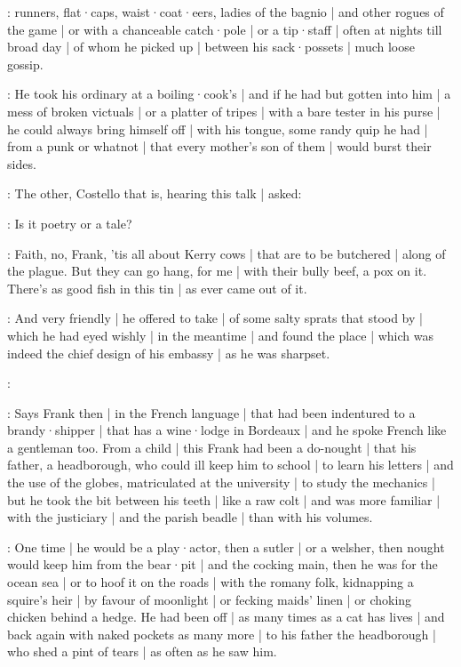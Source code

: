 :
runners,
flat·caps,
waist·coat·eers,
ladies of the bagnio |
and other rogues of the game |
or with a chanceable catch·pole |
or a tip·staff |
often at nights till broad day |
of whom he picked up |
between his sack·possets |
much loose gossip.

:
He took his ordinary at a boiling·cook's |
and if he had but gotten into him |
a mess of broken victuals |
or a platter of tripes |
with a bare tester in his purse |
he could always bring himself off |
with his tongue,
some randy quip he had |
from a punk or whatnot |
that every mother's son of them |
would burst their sides.

:
The other,
Costello that is,
hearing this talk |
asked:

\punch:
Is it poetry or a tale?

\lenehan:
Faith,
no,
Frank,
'tis all about Kerry cows |
that are to be butchered |
along of the plague.
But they can go hang,
for me |
with their bully beef,
a pox on it.
There's as good fish in this tin |
as ever came out of it.

:
And very friendly |
he offered to take |
of some salty sprats that stood by |
which he had eyed wishly |
in the meantime |
and found the place |
which was indeed the chief design of his embassy |
as he was sharpset.

\punch:

:
Says Frank then |
in the French language |
that had been indentured to a brandy·shipper |
that has a wine·lodge in Bordeaux |
and he spoke French like a gentleman too.
From a child |
this Frank had been a do-nought |
that his father,
a headborough,
who could ill keep him to school |
to learn his letters |
and the use of the globes,
matriculated at the university |
to study the mechanics |
but he took the bit between his teeth |
like a raw colt |
and was more familiar |
with the justiciary |
and the parish beadle |
than with his volumes.

:
One time |
he would be a play·actor,
then a sutler |
or a welsher,
then nought would keep him from the bear·pit |
and the cocking main,
then he was for the ocean sea |
or to hoof it on the roads |
with the romany folk,
kidnapping a squire's heir |
by favour of moonlight |
or fecking maids' linen |
or choking chicken behind a hedge.
He had been off |
as many times as a cat has lives |
and back again with naked pockets as many more |
to his father the headborough |
who shed a pint of tears |
as often as he saw him.


